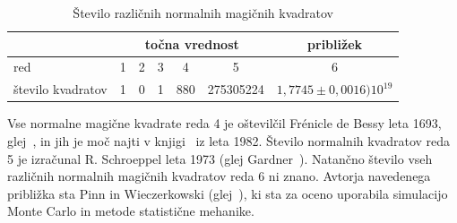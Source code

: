 \documentclass[a4paper,12pt]{article}
\begin{document}
      \begin{table}[!ht]
         \centering
         \caption{Število različnih normalnih magičnih kvadratov}
         \begin{tabular}{lcccccc}\toprule
            & \multicolumn{5}{c}{točna vrednost} & približek \\
            \midrule
            red & 1 & 2 & 3 & 4 & 5 & 6 \\
            število kvadratov & 1 & 0 & 1 & 880 & 275305224 & \(1{,}7745 \pm 0{,}0016) 10 ^ {19}\)\\
            \bottomrule
         \end{tabular}
         \label{table:stevila}
      \end{table}


Vse normalne magične kvadrate reda 4 je oštevilčil Frénicle de Bessy
leta 1693, glej~\cite{bessy}, in jih je moč najti v knjigi~\cite{berlekamp}
iz leta 1982. Število normalnih kvadratov reda 5 je izračunal
R. Schroeppel leta 1973 (glej Gardner~\cite{gardner}).
Natančno število vseh različnih normalnih magičnih kvadratov reda 6 ni znano.
Avtorja navedenega približka sta Pinn in Wieczerkowski (glej~\cite{pinn}), ki
sta za oceno uporabila simulacijo Monte Carlo in metode statistične mehanike.


\newpage



\end{document}
